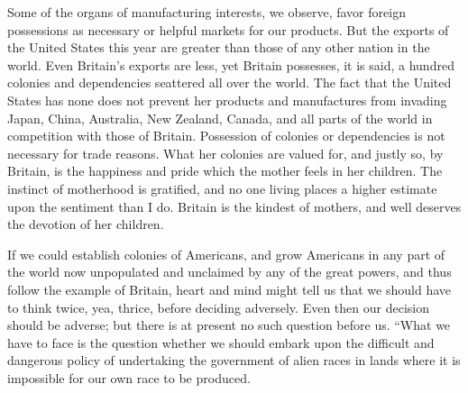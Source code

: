 \documentclass[11pt,openany]{book}
\begin{document}
Some of the organs of manufacturing interests, we observe, favor foreign possessions as necessary or helpful markets for our products. But the exports of the United States this year are greater than those of any other nation in the world. Even Britain's exports are less, yet Britain possesses, it is said, a hundred colonies and dependencies seattered all over the world. The fact that the United States has none does not prevent her products and manufactures from invading Japan, China, Australia, New Zealand, Canada, and all parts of the world in competition with those of Britain. Possession of colonies or dependencies is not necessary for trade reasons. What her colonies are valued for, and justly so, by Britain, is the happiness and pride which the mother feels in her children. The instinct of motherhood is gratified, and no one living places a higher estimate upon the sentiment than I do. Britain is the kindest of mothers, and well deserves the devotion of her children.

If we could establish colonies of Americans, and grow Americans in any part of the world now unpopulated and unclaimed by any of the great powers, and thus follow the example of Britain, heart and mind might tell us that we should have to think twice, yea, thrice, before deciding adversely. Even then our decision should be adverse; but there is at present no such question before us. ``What we have to face is the question whether we should embark upon the difficult and dangerous policy of undertaking the government of alien races in lands where it is impossible for our own race to be produced.
\end{document}
